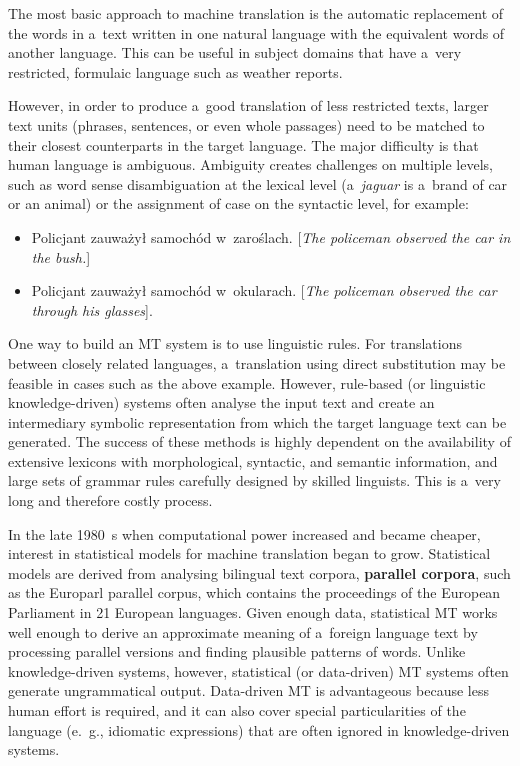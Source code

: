 \begin{multicols}{2}

The most basic approach to machine translation is the automatic
replacement of the words in a~text written in one natural language
with the equivalent words of another language. This can be useful in
subject domains that have a~very restricted, formulaic language such
as weather reports. 

However, in order to produce a~good translation of less restricted
texts, larger text units (phrases, sentences, or even whole passages)
need to be matched to their closest counterparts in the target
language. The major difficulty is that human language is ambiguous.
Ambiguity creates challenges on multiple levels, such as word sense
disambiguation at the lexical level (a~\textit{jaguar} is a~brand of
car or an animal) or the assignment of case on the syntactic level,
for example: 

\begin{itemize} \item Policjant zauważył samochód w~zaroślach.
[\textit{The policeman observed the car in the bush.}] \item Policjant
zauważył samochód w~okularach. [\textit{The policeman observed the
car through his glasses}]. \end{itemize} 

One way to build an MT system is to use linguistic rules. For
translations between closely related languages, a~translation using
direct substitution may be feasible in cases such as the above
example. However, rule-based (or linguistic knowledge-driven) systems
often analyse the input text and create an intermediary symbolic
representation from which the target language text can be generated.
The success of these methods is highly dependent on the availability
of extensive lexicons with morphological, syntactic, and semantic
information, and large sets of grammar rules carefully designed by
skilled linguists. This is a~very long and therefore costly process. 

In the late 1980~s when computational power increased and became
cheaper, interest in statistical models for machine translation began
to grow. Statistical models are derived from analysing bilingual text
corpora, \textbf{parallel corpora}, such as the Europarl parallel
corpus, which contains the proceedings of the European Parliament in
21 European languages. Given enough data, statistical MT works well
enough to derive an approximate meaning of a~foreign language text by
processing parallel versions and finding plausible patterns of words.
Unlike knowledge-driven systems, however, statistical (or data-driven)
MT systems often generate ungrammatical output. Data-driven MT is
advantageous because less human effort is required, and it can also
cover special particularities of the language (e.\, g., idiomatic
expressions) that are often ignored in knowledge-driven systems. 


\end{multicols}
